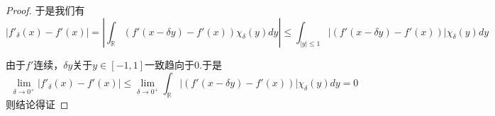 \documentclass[lang=cn,10pt]{elegantbook}
\begin{document}
\begin{proof}
	于是我们有
	\begin{equation*}
		|f\prime_{\delta}\left( x \right) -f\prime\left( x \right) |=|\int_{\mathbb{R}}{\left( f\prime\left( x-\delta y \right) -f\prime\left( x \right) \right) \chi _{\delta}\left( y \right)}dy|\le \int_{|y|\le 1}{|\left( f\prime\left( x-\delta y \right) -f\prime\left( x \right) \right) |\chi _{\delta}\left( y \right)}dy
	\end{equation*}
	
	由于$f'$连续，$\delta y$关于$
	y\in [-1,1]$一致趋向于0.于是
	\begin{equation*}
		\lim_{\delta \rightarrow 0^+} |f\prime_{\delta}\left( x \right) -f\prime\left( x \right) |\le \lim_{\delta \rightarrow 0^+} \int_{\mathbb{R}}{|\left( f\prime\left( x-\delta y \right) -f\prime\left( x \right) \right) |\chi _{\delta}\left( y \right)}dy=0
	\end{equation*}
	则结论得证
	\end{proof}
	
\end{document}
